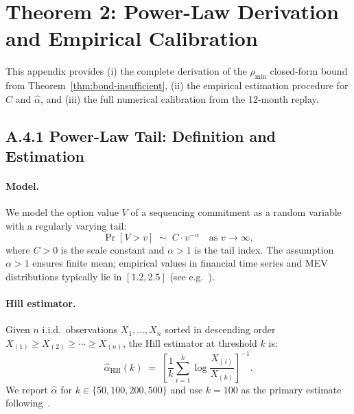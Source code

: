 %

\section{Theorem 2: Power-Law Derivation and Empirical Calibration}
\label{app:theorem2}

This appendix provides (i) the complete derivation of the
$\rho_{\min}$ closed-form bound from Theorem~\ref{thm:bond-insufficient},
(ii) the empirical estimation procedure for $\hat{C}$ and $\hat{\alpha}$,
and (iii) the full numerical calibration from the 12-month replay.

\subsection*{A.4.1 Power-Law Tail: Definition and Estimation}

\paragraph{Model.}
We model the option value $V$ of a sequencing commitment as a random
variable with a regularly varying tail:
\[
  \Pr[V > v] \;\sim\; C \cdot v^{-\alpha} \quad \text{as } v \to \infty,
\]
where $C > 0$ is the scale constant and $\alpha > 1$ is the tail index.
The assumption $\alpha > 1$ ensures finite mean; empirical values in
financial time series and MEV distributions typically lie in $[1.2, 2.5]$
(see e.g.~\cite{Gabaix2009, MantegnaStanley1995}).

\paragraph{Hill estimator.}
Given $n$ i.i.d.\ observations $X_1, \ldots, X_n$ sorted in descending
order $X_{(1)} \geq X_{(2)} \geq \cdots \geq X_{(n)}$, the Hill
estimator at threshold $k$ is:
\[
  \hat{\alpha}_{\mathrm{Hill}}(k) \;=\; \left[
    \frac{1}{k} \sum_{i=1}^{k} \log \frac{X_{(i)}}{X_{(k)}}
  \right]^{-1}.
\]
We report $\hat{\alpha}$ for $k \in \{50, 100, 200, 500\}$ and use
$k = 100$ as the primary estimate following~\cite{EmbrechtsKM1997}.

